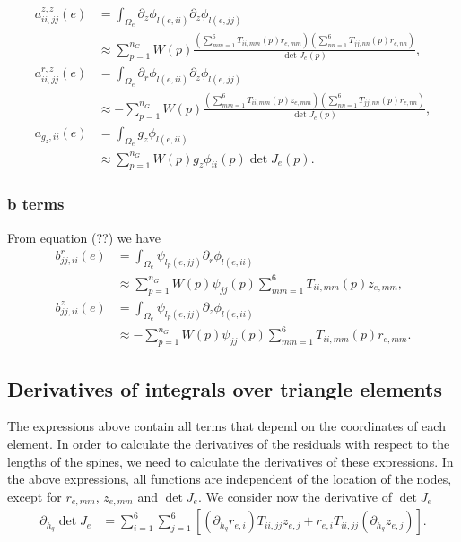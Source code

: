 \documentclass{article}
\begin{document}
\begin{align}
a_{ii,jj}^{z,z}(e) &= \int_{\Omega_e} \partial_z \phi_{l(e,ii)} \partial_z \phi_{l(e,jj)} \tag{20.35}\\
&\approx \sum_{p=1}^{n_G} W(p) \frac{ \left( \sum_{mm=1}^6 T_{ii,mm}(p) r_{e,mm} \right) \left( \sum_{nn=1}^6 T_{jj,nn}(p) r_{e,nn} \right) }{ \det J_e(p) }, \tag{20.37}\\
a_{ii,jj}^{r,z}(e) &= \int_{\Omega_e} \partial_r \phi_{l(e,ii)} \partial_z \phi_{l(e,jj)} \tag{20.38}\\
&\approx -\sum_{p=1}^{n_G} W(p) \frac{ \left( \sum_{mm=1}^6 T_{ii,mm}(p) z_{e,mm} \right) \left( \sum_{nn=1}^6 T_{jj,nn}(p) r_{e,nn} \right) }{ \det J_e(p) }, \tag{20.40}\\
a_{g_z,ii}(e) &= \int_{\Omega_e} g_z \phi_{l(e,ii)} \tag{20.41}\\
&\approx \sum_{p=1}^{n_G} W(p) g_z \phi_{ii}(p) \det J_e(p). \tag{20.43}
\end{align}

\subsubsection{b terms}
From equation (??) we have
\begin{align}
b_{jj,ii}^{r}(e) &= \int_{\Omega_e} \psi_{l_p(e,jj)} \partial_r \phi_{l(e,ii)} \tag{20.44}\\
&\approx \sum_{p=1}^{n_G} W(p) \psi_{jj}(p) \sum_{mm=1}^6 T_{ii,mm}(p) z_{e,mm}, \tag{20.47}\\
b_{jj,ii}^{z}(e) &= \int_{\Omega_e} \psi_{l_p(e,jj)} \partial_z \phi_{l(e,ii)} \tag{20.48}\\
&\approx -\sum_{p=1}^{n_G} W(p) \psi_{jj}(p) \sum_{mm=1}^6 T_{ii,mm}(p) r_{e,mm}. \tag{20.50}
\end{align}

\subsection{Derivatives of integrals over triangle elements}
The expressions above contain all terms that depend on the coordinates of each element. In order to calculate the derivatives of the residuals with respect to the lengths of the spines, we need to calculate the derivatives of these expressions. In the above expressions, all functions are independent of the location of the nodes, except for \(r_{e,mm}\), \(z_{e,mm}\) and \(\det J_e\). We consider now the derivative of \(\det J_e\)
\begin{align}
\partial_{h_q} \det J_e &= \sum_{i=1}^6 \sum_{j=1}^6 \left[ (\partial_{h_q} r_{e,i}) T_{ii,jj} z_{e,j} + r_{e,i} T_{ii,jj} (\partial_{h_q} z_{e,j}) \right]. \tag{20.52}
\end{align}
\end{document}
